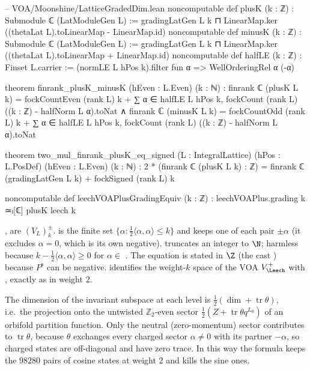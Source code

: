 \begin{leancode}
-- VOA/Moonshine/LatticeGradedDim.lean
noncomputable def plusK (k : ℤ) : Submodule ℂ (LatModuleGen L) :=
  gradingLatGen L k ⊓ LinearMap.ker ((thetaLat L).toLinearMap - LinearMap.id)
noncomputable def minusK (k : ℤ) : Submodule ℂ (LatModuleGen L) :=
  gradingLatGen L k ⊓ LinearMap.ker ((thetaLat L).toLinearMap + LinearMap.id)
noncomputable def halfLE (k : ℤ) : Finset L.carrier :=
  (normLE L hPos k).filter fun α => WellOrderingRel α (-α)

theorem finrank_plusK_minusK (hEven : L.Even) (k : ℕ) :
    finrank ℂ (plusK L k) = fockCountEven (rank L) k
        + ∑ α ∈ halfLE L hPos k, fockCount (rank L) ((k : ℤ) - halfNorm L α).toNat ∧
      finrank ℂ (minusK L k) = fockCountOdd (rank L) k
        + ∑ α ∈ halfLE L hPos k, fockCount (rank L) ((k : ℤ) - halfNorm L α).toNat

theorem two_mul_finrank_plusK_eq_signed (L : IntegralLattice) (hPos : L.PosDef) (hEven : L.Even)
    (k : ℕ) :
    2 * (finrank ℂ (plusK L k) : ℤ) = finrank ℂ (gradingLatGen L k) + fockSigned (rank L) k

noncomputable def leechVOAPlusGradingEquiv (k : ℤ) : leechVOAPlus.grading k ≃ₗ[ℂ] plusK leech k
\end{leancode}

\begin{dictionary}
,  are $(V_L)^\pm_k$.  is the finite set
$\{\alpha:\tfrac12\langle\alpha,\alpha\rangle\le k\}$ and  keeps one of each pair $\pm\alpha$
(it excludes $\alpha=0$, which is its own negative).  truncates an integer to $\N$;
harmless because $k-\tfrac12\langle\alpha,\alpha\rangle\ge0$ for $\alpha\in$ . The equation
 is stated in $\Z$ (the cast ) because
$P^{\mathrm s}$ can be negative.  identifies the weight-$k$ space
of the VOA $V_\Leech^+$ with , exactly as in weight $2$.
\end{dictionary}

\begin{physics}
The dimension of the invariant subspace at each level is $\tfrac12(\dim+\operatorname{tr}\theta)$, i.e.\ the projection onto the untwisted $\mathbb Z_2$-even sector $\tfrac12(Z+\operatorname{tr}\theta q^{L_0})$ of an orbifold partition function. Only the neutral (zero-momentum) sector contributes to $\operatorname{tr}\theta$, because $\theta$ exchanges every charged sector $\alpha\ne0$ with its partner $-\alpha$, so charged states are off-diagonal and have zero trace. In this way the formula keeps the $98280$ pairs of cosine states at weight $2$ and kills the sine ones.
\end{physics}

